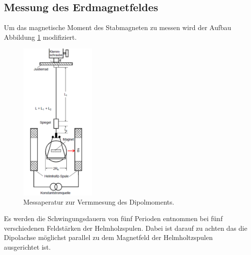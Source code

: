 \subsection{Messung des Erdmagnetfeldes}
Um das magnetische Moment des Stabmagneten zu messen wird der Aufbau Abbildung \ref{fig:Aufbau2} modifiziert. 
\begin{figure}
  \centering
  \includegraphics[height=8cm]{picture/Aufbau2.png}
  \caption{Messaperatur zur Vermmesung des Dipolmoments.}
  \label{fig:Aufbau2}
\end{figure}
Es werden die Schwingungsdauern von fünf Perioden entnommen bei fünf verschiedenen Feldstärken  der Helmholzspulen. Dabei ist darauf zu achten das die Dipolachse möglichst parallel zu dem Magnetfeld der Helmholtzspulen ausgerichtet ist. 

